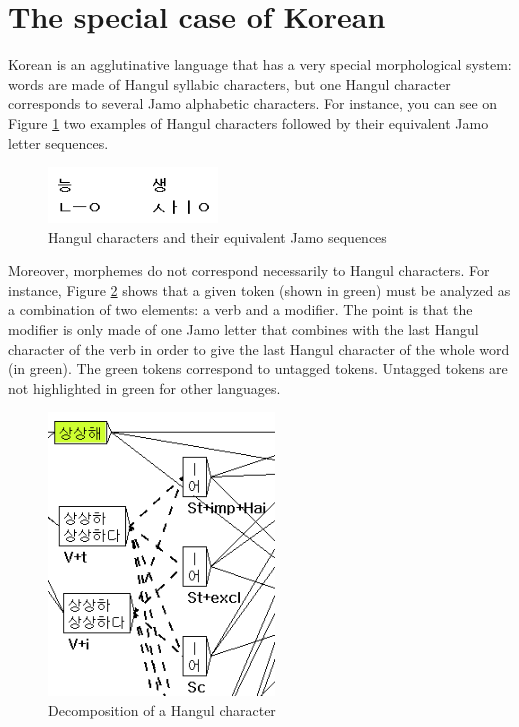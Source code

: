\section{The special case of Korean}
\label{section-korean}
Korean is an agglutinative language that has a very special morphological
system: words are made of Hangul syllabic characters, but one Hangul character
corresponds to several Jamo alphabetic characters. For instance, you can see on
Figure \ref{fig7-korean1} two examples of Hangul characters followed by their
equivalent Jamo letter sequences.

\begin{figure}[!ht]
\begin{center}
\includegraphics[width=4.5cm]{resources/img/fig7-korean1.png}
\caption{Hangul characters and their equivalent Jamo
sequences\label{fig7-korean1}}
\end{center}
\end{figure}

\noindent Moreover, morphemes do not correspond necessarily to Hangul
characters. For instance, Figure \ref{fig7-korean2} shows that a given token
(shown in green) must be analyzed as a combination of two elements: a verb and
a modifier. The point is that the modifier is only made of one Jamo letter that
combines with the last Hangul character of the verb in order to give the last
Hangul character of the whole word (in green). The green tokens correspond to
untagged tokens. Untagged tokens are not highlighted in green for other
languages.

\begin{figure}[!ht]
\begin{center}
\includegraphics[width=6cm]{resources/img/fig7-korean2.png}
\caption{Decomposition of a Hangul character\label{fig7-korean2}}
\end{center}
\end{figure}

